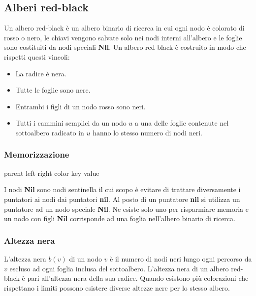 \subsection{Alberi red-black}
Un albero red-black \`e un albero binario di ricerca in cui ogni nodo \`e colorato di rosso o nero, le chiavi vengono salvate solo nei nodi interni 
all'albero e le foglie sono costituiti da nodi speciali \textbf{Nil}. Un albero red-black \`e costruito in modo che rispetti questi vincoli: 
\begin{itemize}
\item La radice \`e nera.
\item Tutte le foglie sono nere.
\item Entrambi i figli di un nodo rosso sono neri.
\item Tutti i cammini semplici da un nodo $u$ a una delle foglie contenute nel sottoalbero radicato in $u$ hanno lo stesso numero di nodi neri.
\end{itemize}
\subsubsection{Memorizzazione}
\begin{multicols}{2}
\begin{algorithm}[H]
\caption{\protect\Tree}
\Tree parent\;
\Tree left\;
\Tree right\;
\Int color\;
\Item key\;
\Item value\;
\end{algorithm}
\columnbreak
I nodi \textbf{Nil} sono nodi sentinella il cui scopo \`e evitare di trattare diversamente i puntatori ai nodi dai puntatori \textbf{nil}. Al posto di un
puntatore \textbf{nil} si utilizza un puntatore ad un nodo speciale \textbf{Nil}. Ne esiste solo uno per risparmiare memoria e un nodo con figli 
\textbf{Nil} corrisponde ad una foglia nell'albero binario di ricerca.
\end{multicols}
\subsubsection{Altezza nera}
L'altezza nera $b(v)$ di un nodo $v$ \`e il numero di nodi neri lungo ogni percorso da $v$ escluso ad ogni foglia inclusa del sottoalbero. L'altezza nera di
un albero red-black \`e pari all'altezza nera della sua radice. Quando esistono pi\`u colorazioni che rispettano i limiti possono esistere diverse altezze
nere per lo stesso albero. 
